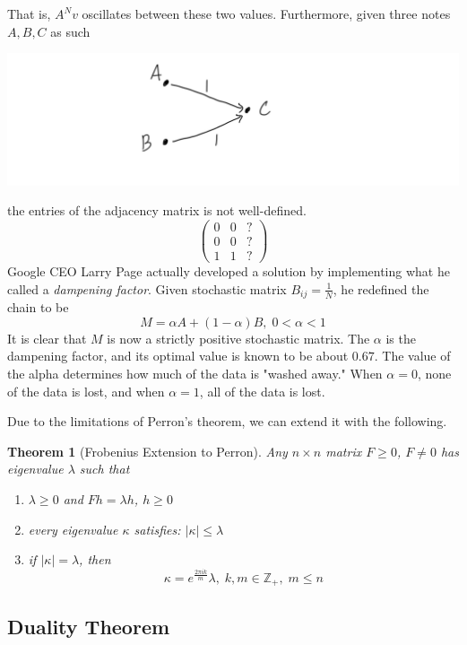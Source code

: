 \documentclass{article}
\newtheorem{theorem}{Theorem}[section]
\theoremstyle{remark}
\theoremstyle{definition}
\begin{document}
    That is, $A^N v$ oscillates between these two values. Furthermore, given three notes $A, B, C$ as such
    \begin{center}
        \includegraphics[scale=0.25]{img/Degeneratre_Markov_Chain.PNG} 
    \end{center}
    the entries of the adjacency matrix is not well-defined. 
    \[ \begin{pmatrix} 0&0&? \\0&0&? \\1&1&?\end{pmatrix}\]
    Google CEO Larry Page actually developed a solution by implementing what he called a \textit{dampening factor}. Given stochastic matrix $B_{i j} = \frac{1}{N}$, he redefined the chain to be 
    \[M = \alpha A + (1-\alpha) B, \; 0< \alpha < 1\]
    It is clear that $M$ is now a strictly positive stochastic matrix. The $\alpha$ is the dampening factor, and its optimal value is known to be about $0.67$. The value of the alpha determines how much of the data is "washed away." When $\alpha = 0$, none of the data is lost, and when $\alpha = 1$, all of the data is lost. 

    Due to the limitations of Perron's theorem, we can extend it with the following.

    \begin{theorem}[Frobenius Extension to Perron]
    Any $n \times n$ matrix $F \geq 0$, $F \neq 0$ has eigenvalue $\lambda$ such that
    \begin{enumerate}
        \item $\lambda \geq 0$ and $F h = \lambda h$, $h\geq 0$ \item every eigenvalue $\kappa$ satisfies: $|\kappa| \leq \lambda$ 
        \item if $|\kappa| = \lambda$, then 
    \[\kappa = e^{\frac{2 \pi i k}{m}} \lambda, \; k, m \in \mathbb{Z}_+, \; m \leq n\]
    \end{enumerate}
    \end{theorem}

  \subsection{Duality Theorem}
\end{document}
